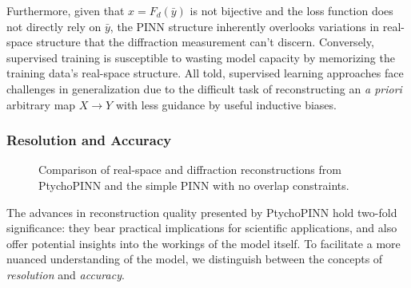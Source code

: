 \documentclass[sn-mathphys]{sn-jnl}%
\theoremstyle{thmstyleone}%
\theoremstyle{thmstyletwo}%
\theoremstyle{thmstylethree}%
\begin{document}
Furthermore, given that $\hat{x} = F_d(\bar{y})$ is not bijective and the loss function does not directly rely on $\bar{y}$, the PINN structure inherently overlooks variations in real-space structure that the diffraction measurement can't discern. Conversely, supervised training is susceptible to wasting model capacity by memorizing the training data's real-space structure. All told, supervised learning approaches face challenges in generalization due to the difficult task of reconstructing an \emph{a priori} arbitrary map $X \rightarrow Y$ with less guidance by useful inductive biases.


\subsubsection{Resolution and Accuracy}

\begin{figure}
    \centering
    \caption{Comparison of real-space and diffraction reconstructions from PtychoPINN and the simple PINN with no overlap constraints.}%
    \label{fig:patches}
\end{figure}

The advances in reconstruction quality presented by PtychoPINN hold two-fold significance: they bear practical implications for scientific applications, and also offer potential insights into the workings of the model itself. To facilitate a more nuanced understanding of the model, we distinguish between the concepts of \emph{resolution} and \emph{accuracy}.
\end{document}
